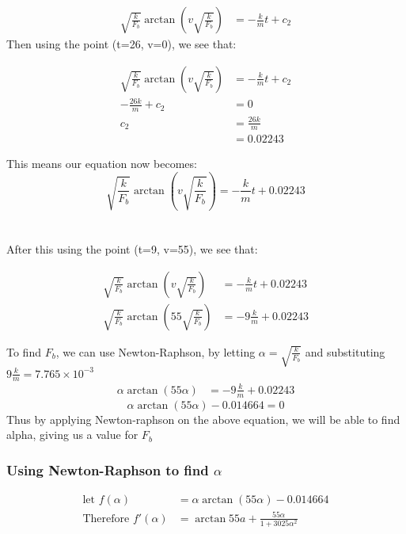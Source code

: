 \begin{align*}
    \sqrt{\frac{k}{F_b}} \arctan{(v\sqrt{\frac{k}{F_b}})} &= -\frac{k}{m}t + c_2
\end{align*}
Then using the point (t=26, v=0), we see that:
\begin{center}
\begin{align*}
    \sqrt{\frac{k}{F_b}} \arctan{(v\sqrt{\frac{k}{F_b}})} &= -\frac{k}{m}t + c_2
    \\ -\frac{26k}{m} + c_2 &= 0
    \\ c_2 &= \frac{26k}{m} 
    \\ &= 0.02243
\end{align*}
\end{center}
This means our equation now becomes:
\begin{equation}
    \sqrt{\frac{k}{F_b}} \arctan{(v\sqrt{\frac{k}{F_b}})} = -\frac{k}{m}t + 0.02243
\end{equation}
\\ \\
After this using the point (t=9, v=55), we see that:
\\
\begin{center}
\begin{align*}
    \sqrt{\frac{k}{F_b}} \arctan{(v\sqrt{\frac{k}{F_b}})} &= -\frac{k}{m}t + 0.02243
    \\ \sqrt{\frac{k}{F_b}} \arctan{(55\sqrt{\frac{k}{F_b}})} &= -9\frac{k}{m} + 0.02243
\end{align*}
\end{center}
To find $F_b$, we can use Newton-Raphson, by letting $\alpha=\sqrt{\frac{k}{F_b}}$ and substituting $9 \frac{k}{m} = 7.765\times{10^{-3}}$
\begin{align*}
    \alpha \arctan{(55\alpha)} &= -9 \frac{k}{m} + 0.02243
\end{align*}
\begin{equation}
    \alpha \arctan{(55\alpha)} - 0.014664 = 0
\end{equation}
Thus by applying Newton-raphson on the above equation, we will be able to find alpha, giving us a value for $F_b$

\subsubsection{Using Newton-Raphson to find $\alpha$}
\begin{align*}
    \text{let } f(\alpha) &= \alpha \arctan{(55\alpha)} - 0.014664
    \\ \text{Therefore } f'(\alpha) &= \arctan{55a} + \frac{55\alpha}{1+3025\alpha^2}
\end{align*}

